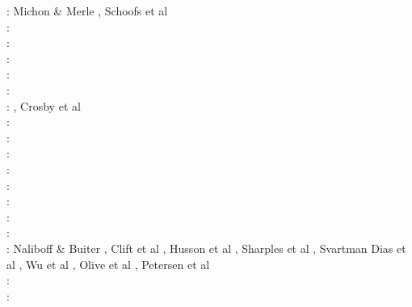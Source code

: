 \begin{scriptsize}
\twothousand: Michon \& Merle \cite{mime00}, Schoofs et al \cite{scth00}\\
\twothousandone: \cite{hupc01}\cite{hupc01b}\cite{frbr01}\cite{frnb01a}\cite{frnb01b}\\
\twothousandtwo: \cite{hube02}\cite{hani02}\cite{dabm02}\cite{vacl02}\cite{belz02}\cite{hupc02}
      \cite{hube02b}\cite{vacl02}\cite{labu02}\\
\twothousandthree: \cite{hube03}\cite{hani03}\cite{covb03}\cite{wibm03}\\
\twothousandfour: \cite{hier04}\cite{sees04}\\
\twothousandfive: \cite{hubb05}\cite{coub05}\cite{vanw05}\cite{vabl05}\\
\twothousandsix: \cite{tibs06}\cite{coma06}\cite{crwy06}\cite{peso06}\cite{lemm06}\cite{malm06}, Crosby et al \cite{crms06}\\
\twothousandseven: \cite{huha07}\cite{macl07}\cite{vabl07}\cite{dyrm07}\cite{hube07}\cite{buto07}\cite{socb07}
      \cite{werr07}\\
\twothousandeight: \cite{cort08}\cite{gumb08}\cite{buhb08}\cite{hube08}\cite{peso08}\cite{rerw08}\cite{codh08}\\
\twothousandnine: \cite{agcz09}\cite{kekj09}\cite{sihb09}\\
\twothousandten: \cite{aubh10}\cite{gery10}\cite{fosr10}\cite{gerya2010}\\
\twothousandeleven: \cite{alht11}\cite{ellw11}\cite{hube11}\\
\twothousandtwelve: \cite{alht12}\cite{brps12}\cite{bein12}\\
\twothousandthirteen: \cite{alhf13}\cite{brau13}\cite{chbe13}\cite{knak13}\cite{kern13}\cite{mipf13}\cite{wabd13}
      \cite{gery13}\cite{ligw13}\cite{gery13c}\cite{ebvk13}\\
\twothousandfourteen: \cite{hebr14}\cite{lige14}\cite{brun14}\cite{kobf14}\cite{ebva14}\cite{puge14}\cite{lige14b}
      \cite{hube14}\cite{gogu14}\cite{ebva14}\cite{cosb14}\\
\twothousandfifteen: Naliboff \& Buiter \cite{nabu15}, Clift et al \cite{clbq15}, Husson et al \cite{huyb15},
                     Sharples et al \cite{shmj15}, Svartman Dias et al \cite{svlh15}, Wu et al \cite{wulc15},
                     Olive et al \cite{olbi15}, Petersen et al \cite{pean15}\\
\twothousandsixteen: \cite{olbm16}\cite{jekm16}\cite{zwsn16}\\
\twothousandseventeen: \cite{lemh17}\cite{brcr17}\cite{bekb17}\cite{nabp17}\\

\end{scriptsize}
